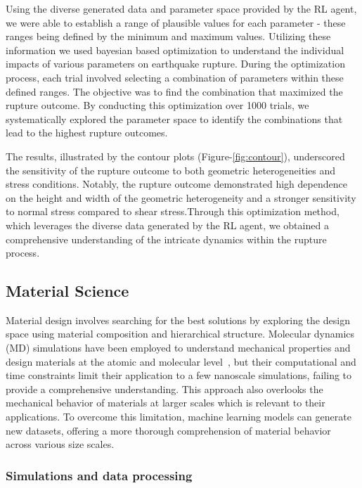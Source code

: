 \documentclass{article}
\begin{document}
Using the diverse generated data and parameter space provided by the RL agent, we were able to establish a range of plausible values for each parameter - these ranges being defined by the minimum and maximum values. Utilizing these information we used bayesian based optimization to understand the individual impacts of various parameters on earthquake rupture. During the optimization process, each trial involved selecting a combination of parameters within these defined ranges. The objective was to find the combination that maximized the rupture outcome. By conducting this optimization over 1000 trials, we systematically explored the parameter space to identify the combinations that lead to the highest rupture outcomes.

The results, illustrated by the contour plots (Figure-\ref{fig:contour}), underscored the sensitivity of the rupture outcome to both geometric heterogeneities and stress conditions. Notably, the rupture outcome demonstrated high dependence on the height and width of the geometric heterogeneity and a stronger sensitivity to normal stress compared to shear stress.Through this optimization method, which leverages the diverse data generated by the RL agent, we obtained a comprehensive understanding of the intricate dynamics within the rupture process.


\subsection{Material Science}
Material design involves searching for the best solutions by exploring the design space using
material composition and hierarchical structure. Molecular dynamics (MD) simulations have been
employed to understand mechanical properties and design materials at the atomic and molecular level~\citep{uddin2023finite, uddin2020studying, uddinstudy,mesbah2023study}, but
their computational and time constraints limit their application to a few nanoscale simulations, failing to
provide a comprehensive understanding. This approach also overlooks the mechanical behavior of
materials at larger scales which is relevant to their applications. To overcome this limitation, machine
learning models can generate new datasets, offering a more thorough comprehension of material behavior
across various size scales.

\subsubsection{Simulations and data processing}
\end{document}
